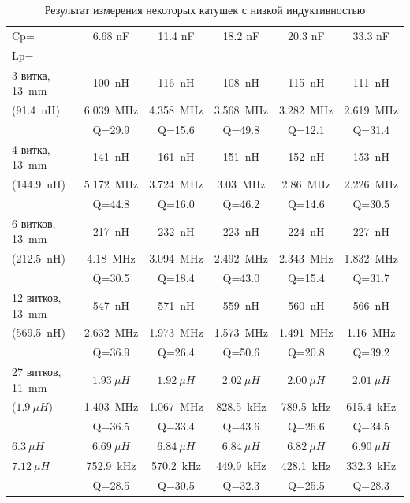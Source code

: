 \begin{table}[H]
\begin{center}
\begin{tabular}{| l | c | c | c | c | c |}
\hline
\hspace{1.5 cm} Cp= & 6.68 nF    & 11.4 nF    & 18.2 nF    & 20.3 nF    & 33.3 nF \\
Lp=           &           &           &           &           &        \\
\hline
\hline
3 витка, 13~mm & 100~nH     & 116~nH     & 108~nH     & 115~nH     & 111~nH  \\
 (91.4~nH) & 6.039~MHz  & 4.358~MHz  & 3.568~MHz  & 3.282~MHz  & 2.619~MHz \\
              & Q=29.9    & Q=15.6    & Q=49.8    & Q=12.1    & Q=31.4  \\
\hline
4 витка, 13~mm & 141~nH     & 161~nH     & 151~nH     & 152~nH     & 153~nH  \\
 (144.9~nH)     & 5.172~MHz  & 3.724~MHz  & 3.03~MHz   & 2.86~MHz   & 2.226~MHz \\
              & Q=44.8    & Q=16.0    & Q=46.2    & Q=14.6    & Q=30.5  \\
\hline
6 витков, 13~mm & 217~nH     & 232~nH     & 223~nH     & 224~nH     & 227~nH  \\
 (212.5~nH)    & 4.18~MHz   & 3.094~MHz  & 2.492~MHz  & 2.343~MHz  & 1.832~MHz \\
              & Q=30.5    & Q=18.4    & Q=43.0    & Q=15.4    & Q=31.7  \\
\hline
12 витков, 13~mm     & 547~nH     & 571~nH     & 559~nH     & 560~nH     & 566~nH  \\
 (569.5~nH)    & 2.632~MHz  & 1.973~MHz  & 1.573~MHz  & 1.491~MHz  & 1.16~MHz \\
              & Q=36.9    & Q=26.4    & Q=50.6    & Q=20.8    & Q=39.2  \\
\hline
27 витков, 11~mm & \(1.93~\mu H\) & \(1.92~\mu H\) & \(2.02~\mu H\) & \(2.00~\mu H\) & \(2.01~\mu H\)  \\
(\(1.9~\mu H\)) & 1.403~MHz  & 1.067~MHz  & 828.5~kHz  & 789.5~kHz  & 615.4~kHz \\
              & Q=36.5    & Q=33.4    & Q=43.6    & Q=26.6    & Q=34.5  \\
\hline
\(6.3~\mu H\)  & \(6.69~\mu H\) & \(6.84~\mu H\) & \(6.84~\mu H\) & \(6.82~\mu H\) & \(6.90~\mu H\)  \\
\(7.12~\mu H\) & 752.9~kHz  & 570.2~kHz  & 449.9~kHz  & 428.1~kHz  & 332.3~kHz \\
              & Q=28.5    & Q=30.5    & Q=32.3    & Q=25.5    & Q=28.3  \\
\hline
\end{tabular}
\end{center}
\caption{Результат измерения некоторых катушек с низкой индуктивностью}
\label{tab:littleInductors}
\end{table}

